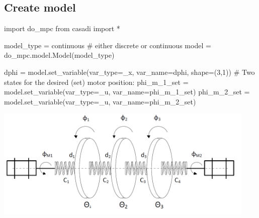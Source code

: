 \documentclass[
  letterpaper,
  DIV=11,
  numbers=noendperiod,
  oneside]{scrartcl}
\newenvironment{Shaded}{\begin{snugshade}}{\end{snugshade}}
\newcommand{\CommentTok}[1]{\textcolor[rgb]{0.37,0.37,0.37}{#1}}
\newcommand{\DecValTok}[1]{\textcolor[rgb]{0.68,0.00,0.00}{#1}}
\newcommand{\ImportTok}[1]{\textcolor[rgb]{0.00,0.46,0.62}{#1}}
\newcommand{\NormalTok}[1]{\textcolor[rgb]{0.00,0.23,0.31}{#1}}
\newcommand{\OperatorTok}[1]{\textcolor[rgb]{0.37,0.37,0.37}{#1}}
\newcommand{\StringTok}[1]{\textcolor[rgb]{0.13,0.47,0.30}{#1}}
\begin{document}
\subsection{Create model}\label{create-model}

\begin{Shaded}
\begin{Highlighting}[numbers=left,,]
\ImportTok{import}\NormalTok{ do\_mpc}
\ImportTok{from}\NormalTok{ casadi }\ImportTok{import} \OperatorTok{*}

\NormalTok{model\_type }\OperatorTok{=} \StringTok{\textquotesingle{}continuous\textquotesingle{}} \CommentTok{\# either \textquotesingle{}discrete\textquotesingle{} or \textquotesingle{}continuous\textquotesingle{}}
\NormalTok{model }\OperatorTok{=}\NormalTok{ do\_mpc.model.Model(model\_type)}

\NormalTok{dphi }\OperatorTok{=}\NormalTok{ model.set\_variable(var\_type}\OperatorTok{=}\StringTok{\textquotesingle{}\_x\textquotesingle{}}\NormalTok{, var\_name}\OperatorTok{=}\StringTok{\textquotesingle{}dphi\textquotesingle{}}\NormalTok{, shape}\OperatorTok{=}\NormalTok{(}\DecValTok{3}\NormalTok{,}\DecValTok{1}\NormalTok{))}
\CommentTok{\# Two states for the desired (set) motor position:}
\NormalTok{phi\_m\_1\_set }\OperatorTok{=}\NormalTok{ model.set\_variable(var\_type}\OperatorTok{=}\StringTok{\textquotesingle{}\_u\textquotesingle{}}\NormalTok{, var\_name}\OperatorTok{=}\StringTok{\textquotesingle{}phi\_m\_1\_set\textquotesingle{}}\NormalTok{)}
\NormalTok{phi\_m\_2\_set }\OperatorTok{=}\NormalTok{ model.set\_variable(var\_type}\OperatorTok{=}\StringTok{\textquotesingle{}\_u\textquotesingle{}}\NormalTok{, var\_name}\OperatorTok{=}\StringTok{\textquotesingle{}phi\_m\_2\_set\textquotesingle{}}\NormalTok{)}
\end{Highlighting}
\end{Shaded}

\begin{center}
\includegraphics[width=\textwidth,height=2.08333in]{figs/triple_mass_spring.png}
\end{center}
\end{document}
